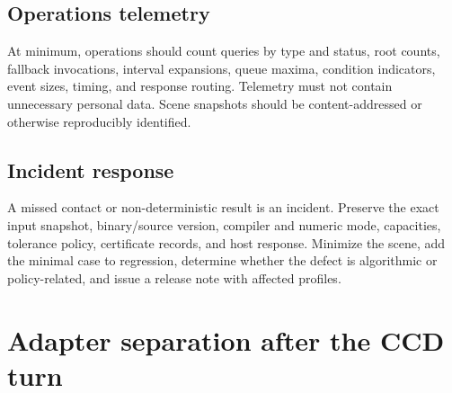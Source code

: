 \documentclass[11pt,a4paper,oneside]{book}
\begin{document}
\section{Operations telemetry}

At minimum, operations should count queries by type and status, root counts, fallback invocations, interval expansions, queue maxima, condition indicators, event sizes, timing, and response routing. Telemetry must not contain unnecessary personal data. Scene snapshots should be content-addressed or otherwise reproducibly identified.

\section{Incident response}

A missed contact or non-deterministic result is an incident. Preserve the exact input snapshot, binary/source version, compiler and numeric mode, capacities, tolerance policy, certificate records, and host response. Minimize the scene, add the minimal case to regression, determine whether the defect is algorithmic or policy-related, and issue a release note with affected profiles.

\chapter{Adapter separation after the CCD turn}
\end{document}
